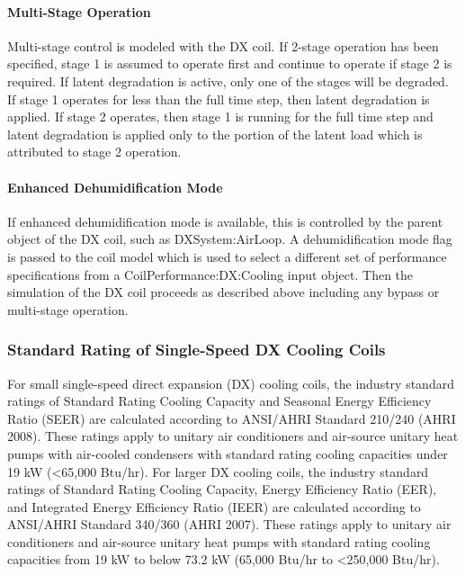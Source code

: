 \paragraph{Multi-Stage Operation}\label{multi-stage-operation}

Multi-stage control is modeled with the DX coil. If 2-stage operation has been specified, stage 1 is assumed to operate first and continue to operate if stage 2 is required. If latent degradation is active, only one of the stages will be degraded. If stage 1 operates for less than the full time step, then latent degradation is applied. If stage 2 operates, then stage 1 is running for the full time step and latent degradation is applied only to the portion of the latent load which is attributed to stage 2 operation.

\paragraph{Enhanced Dehumidification Mode}\label{enhanced-dehumidification-mode}

If enhanced dehumidification mode is available, this is controlled by the parent object of the DX coil, such as DXSystem:AirLoop. A dehumidification mode flag is passed to the coil model which is used to select a different set of performance specifications from a CoilPerformance:DX:Cooling input object. Then the simulation of the DX coil proceeds as described above including any bypass or multi-stage operation.

\subsubsection{Standard Rating of Single-Speed DX Cooling Coils}\label{standard-rating-of-single-speed-dx-cooling-coils}

For small single-speed direct expansion (DX) cooling coils, the industry standard ratings of Standard Rating Cooling Capacity and Seasonal Energy Efficiency Ratio (SEER) are calculated according to ANSI/AHRI Standard 210/240 (AHRI 2008). These ratings apply to unitary air conditioners and air-source unitary heat pumps with air-cooled condensers with standard rating cooling capacities under 19 kW (\textless{}65,000 Btu/hr). For larger DX cooling coils, the industry standard ratings of Standard Rating Cooling Capacity, Energy Efficiency Ratio (EER), and Integrated Energy Efficiency Ratio (IEER) are calculated according to ANSI/AHRI Standard 340/360 (AHRI 2007). These ratings apply to unitary air conditioners and air-source unitary heat pumps with standard rating cooling capacities from 19 kW to below 73.2 kW (65,000 Btu/hr to \textless{}250,000 Btu/hr).

